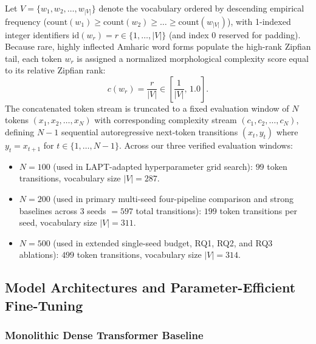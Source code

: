 \documentclass{interact}
\begin{document}
Let $V = \{w_1, w_2, \dots, w_{|V|}\}$ denote the vocabulary ordered by descending empirical frequency ($\text{count}(w_1) \ge \text{count}(w_2) \ge \dots \ge \text{count}(w_{|V|})$), with 1-indexed integer identifiers $\text{id}(w_r) = r \in \{1, \dots, |V|\}$ (and index $0$ reserved for padding). Because rare, highly inflected Amharic word forms populate the high-rank Zipfian tail, each token $w_r$ is assigned a normalized morphological complexity score equal to its relative Zipfian rank:
\begin{equation}
    c(w_r) = \frac{r}{|V|} \in \left[\frac{1}{|V|}, \, 1.0\right].
    \label{eq:zipf_complexity}
\end{equation}
The concatenated token stream is truncated to a fixed evaluation window of $N$ tokens $(x_1, x_2, \dots, x_N)$ with corresponding complexity stream $(c_1, c_2, \dots, c_N)$, defining $N - 1$ sequential autoregressive next-token transitions $(x_t, y_t)$ where $y_t = x_{t+1}$ for $t \in \{1, \dots, N-1\}$. Across our three verified evaluation windows:
\begin{itemize}
    \item $N = 100$ (used in LAPT-adapted hyperparameter grid search): $99$ token transitions, vocabulary size $|V| = 287$.
    \item $N = 200$ (used in primary multi-seed four-pipeline comparison and strong baselines across $3$ seeds $= 597$ total transitions): $199$ token transitions per seed, vocabulary size $|V| = 311$.
    \item $N = 500$ (used in extended single-seed budget, RQ1, RQ2, and RQ3 ablations): $499$ token transitions, vocabulary size $|V| = 314$.
\end{itemize}

\subsection{Model Architectures and Parameter-Efficient Fine-Tuning}
\label{subsec:architecture}

\subsubsection{Monolithic Dense Transformer Baseline}
\end{document}

